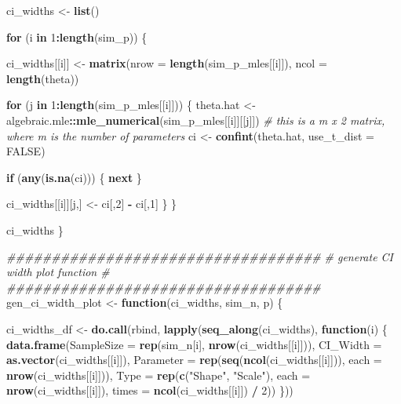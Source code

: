 \documentclass[
]{article}
\newenvironment{Shaded}{\begin{snugshade}}{\end{snugshade}}
\newcommand{\CommentTok}[1]{\textcolor[rgb]{0.56,0.35,0.01}{\textit{#1}}}
\newcommand{\ControlFlowTok}[1]{\textcolor[rgb]{0.13,0.29,0.53}{\textbf{#1}}}
\newcommand{\DataTypeTok}[1]{\textcolor[rgb]{0.13,0.29,0.53}{#1}}
\newcommand{\DecValTok}[1]{\textcolor[rgb]{0.00,0.00,0.81}{#1}}
\newcommand{\KeywordTok}[1]{\textcolor[rgb]{0.13,0.29,0.53}{\textbf{#1}}}
\newcommand{\NormalTok}[1]{#1}
\newcommand{\OperatorTok}[1]{\textcolor[rgb]{0.81,0.36,0.00}{\textbf{#1}}}
\newcommand{\OtherTok}[1]{\textcolor[rgb]{0.56,0.35,0.01}{#1}}
\newcommand{\StringTok}[1]{\textcolor[rgb]{0.31,0.60,0.02}{#1}}
\begin{document}
\begin{Shaded}
\begin{Highlighting}[]
\NormalTok{    ci\_widths \textless{}{-}}\StringTok{ }\KeywordTok{list}\NormalTok{()}

    \ControlFlowTok{for}\NormalTok{ (i }\ControlFlowTok{in} \DecValTok{1}\OperatorTok{:}\KeywordTok{length}\NormalTok{(sim\_p)) \{}

\NormalTok{        ci\_widths[[i]] \textless{}{-}}\StringTok{ }\KeywordTok{matrix}\NormalTok{(}\DataTypeTok{nrow =} \KeywordTok{length}\NormalTok{(sim\_p\_mles[[i]]), }\DataTypeTok{ncol =} \KeywordTok{length}\NormalTok{(theta))}

        \ControlFlowTok{for}\NormalTok{ (j }\ControlFlowTok{in} \DecValTok{1}\OperatorTok{:}\KeywordTok{length}\NormalTok{(sim\_p\_mles[[i]])) \{}
\NormalTok{            theta.hat \textless{}{-}}\StringTok{ }\NormalTok{algebraic.mle}\OperatorTok{::}\KeywordTok{mle\_numerical}\NormalTok{(sim\_p\_mles[[i]][[j]])}
            \CommentTok{\# this is a m x 2 matrix, where m is the number of parameters}
\NormalTok{            ci \textless{}{-}}\StringTok{ }\KeywordTok{confint}\NormalTok{(theta.hat, }\DataTypeTok{use\_t\_dist =} \OtherTok{FALSE}\NormalTok{)}

            \ControlFlowTok{if}\NormalTok{ (}\KeywordTok{any}\NormalTok{(}\KeywordTok{is.na}\NormalTok{(ci))) \{}
                \ControlFlowTok{next}
\NormalTok{            \}}

\NormalTok{            ci\_widths[[i]][j,] \textless{}{-}}\StringTok{ }\NormalTok{ci[,}\DecValTok{2}\NormalTok{] }\OperatorTok{{-}}\StringTok{ }\NormalTok{ci[,}\DecValTok{1}\NormalTok{]}
\NormalTok{        \}}
\NormalTok{    \}}

\NormalTok{    ci\_widths}
\NormalTok{\}}

\CommentTok{\#\#\#\#\#\#\#\#\#\#\#\#\#\#\#\#\#\#\#\#\#\#\#\#\#\#\#\#\#\#\#\#\#\#\#}
\CommentTok{\# generate CI width plot function \#}
\CommentTok{\#\#\#\#\#\#\#\#\#\#\#\#\#\#\#\#\#\#\#\#\#\#\#\#\#\#\#\#\#\#\#\#\#\#\#}
\NormalTok{gen\_ci\_width\_plot \textless{}{-}}\StringTok{ }\ControlFlowTok{function}\NormalTok{(ci\_widths, sim\_n, p) \{}

\NormalTok{    ci\_widths\_df \textless{}{-}}\StringTok{ }\KeywordTok{do.call}\NormalTok{(rbind, }\KeywordTok{lapply}\NormalTok{(}\KeywordTok{seq\_along}\NormalTok{(ci\_widths), }\ControlFlowTok{function}\NormalTok{(i) \{}
    \KeywordTok{data.frame}\NormalTok{(}\DataTypeTok{SampleSize =} \KeywordTok{rep}\NormalTok{(sim\_n[i], }\KeywordTok{nrow}\NormalTok{(ci\_widths[[i]])),}
                \DataTypeTok{CI\_Width =} \KeywordTok{as.vector}\NormalTok{(ci\_widths[[i]]),}
                \DataTypeTok{Parameter =} \KeywordTok{rep}\NormalTok{(}\KeywordTok{seq}\NormalTok{(}\KeywordTok{ncol}\NormalTok{(ci\_widths[[i]])), }\DataTypeTok{each =} \KeywordTok{nrow}\NormalTok{(ci\_widths[[i]])),}
                \DataTypeTok{Type =} \KeywordTok{rep}\NormalTok{(}\KeywordTok{c}\NormalTok{(}\StringTok{"Shape"}\NormalTok{, }\StringTok{"Scale"}\NormalTok{), }\DataTypeTok{each =} \KeywordTok{nrow}\NormalTok{(ci\_widths[[i]]), }\DataTypeTok{times =} \KeywordTok{ncol}\NormalTok{(ci\_widths[[i]]) }\OperatorTok{/}\StringTok{ }\DecValTok{2}\NormalTok{))}
\NormalTok{    \}))}


\end{Highlighting}
\end{Shaded}
\end{document}
